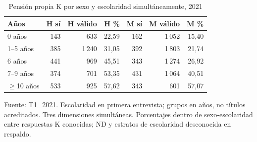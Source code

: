 \begin{table}[!htbp]
\centering
\caption{Pensión propia K por sexo y escolaridad simultáneamente, 2021}\label{tab:exploracion-sexo-educacion}
\small\setlength{\tabcolsep}{4pt}
\renewcommand{\arraystretch}{1.15}
\begin{tabular}{lrrrrrr}
\toprule
\textbf{Años} & \textbf{H sí} & \textbf{H válido} & \textbf{H \%} & \textbf{M sí} & \textbf{M válido} & \textbf{M \%} \\
\midrule
0 años & 143 & 633 & 22,59 & 162 & 1\,052 & 15,40 \\
1--5 años & 385 & 1\,240 & 31,05 & 392 & 1\,803 & 21,74 \\
6 años & 441 & 969 & 45,51 & 343 & 1\,274 & 26,92 \\
7--9 años & 374 & 701 & 53,35 & 431 & 1\,064 & 40,51 \\
$\geq$10 años & 533 & 925 & 57,62 & 343 & 601 & 57,07 \\
\bottomrule
\end{tabular}
\par\medskip
\parbox{\linewidth}{\footnotesize Fuente: T1\_2021. Escolaridad en primera entrevista; grupos en años, no títulos acreditados. Tres dimensiones simultáneas. Porcentajes dentro de sexo-escolaridad entre respuestas K conocidas; ND y estratos de escolaridad desconocida en respaldo.}
\end{table}
